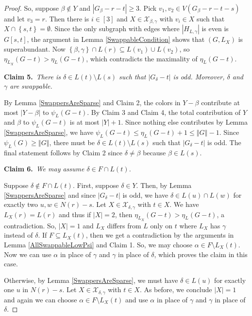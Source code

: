 \documentclass[12pt]{article}
\theoremstyle{plain}
\theoremstyle{definition}
\theoremstyle{remark}
\newcommand{\fancy}[1]{\mathcal{#1}}
\newcommand{\set}[1]{\left\{ #1 \right\}}
\newcommand{\card}[1]{\left|#1\right|}
\newcommand{\size}[1]{\left\Vert#1\right\Vert}
\newcommand{\irange}[1]{\left[#1\right]}
\def\X{\fancy{X}}
\newcommand{\claim}[2]{{\bf Claim #1.}~{\it #2}~~}
\begin{document}
\begin{proof}
		So, suppose $\beta \not \in Y$ and $\card{G_\beta - r - t} \ge 3$. Pick $v_1, v_2 \in V(G_\beta - r - t - s)$ and let $v_3 = r$.  Then there is $i \in \irange{3}$ and $X \in \X_{\beta,\gamma}$ with $v_i \in X$ such that $X \cap \set{s,t} = \emptyset$.  Since the only subgraph with edges where $\card{H_{L, \gamma}}$ is even is $G[s, t]$, the argument in Lemma \ref{SwappableCondition} shows that $(G,L_X)$ is superabundant.  Now $\set{\beta, \gamma} \cap L(r) \subseteq L(v_1) \cup L(v_2)$, so $\eta_{L_X}(G - t) > \eta_L(G - t)$, which contradicts the maximality of $\eta_L(G - t)$.
		
		\claim{5}{There is $\delta \in L(t) \setminus L(s)$ such that $\card{G_\delta - t}$ is odd.  Moreover, $\delta$ and $\gamma$ are swappable.}
		
			By Lemma \ref{SwappersAreSparse} and Claim 2, the colors in $Y - \beta$ contribute at most $|Y - \beta|$ to $\psi_L(G - t)$.  By Claim 3 and Claim 4, the total contribution of $Y$ and $\beta$ to $\psi_L(G - t)$ is at most $\card{Y} + 1$.  Since nothing else contributes by  Lemma \ref{SwappersAreSparse}, we have $\psi_L(G - t) \le \eta_L(G - t) + 1 \le \size{G} - 1$.  Since $\psi_L(G) \ge \size{G}$, there must be $\delta \in L(t) \setminus L(s)$ such that $\card{G_\delta - t}$ is odd.  The final statement follows by Claim 2 since $\delta \ne \beta$ because $\beta \in L(s)$.
			
		\claim{6}{We may assume $\delta \in F \cap L(t)$.}
		
			Suppose  $\delta \not \in F \cap L(t)$.  First, suppose $\delta \in Y$. Then, by Lemma \ref{SwappersAreSparse} and since $\card{G_\delta - t}$ is odd, we have $\delta \in L(u) \cap L(w)$ for exactly two $u,w \in N(r) - s$.   Let $X \in \X_{\delta,\gamma}$ with $t \in X$.  We have $L_X(r) = L(r)$ and thus if $|X| = 2$, then $\eta_{L_X}(G - t) > \eta_L(G - t)$, a contradiction.  So, $|X| = 1$ and $L_X$ differs from $L$ only on $t$ where $L_X$ has $\gamma$ instead of $\delta$. If $F \subseteq L_X(t)$, then we get a contradiction by the arguments in Lemma \ref{AllSwappableLowPsi} and Claim 1.  So, we may choose $\alpha \in F \setminus L_X(t)$. Now we can use $\alpha$ in place of $\gamma$ and $\gamma$ in place of $\delta$, which proves the claim in this case.
			
			Otherwise, by Lemma \ref{SwappersAreSparse}, we must have $\delta \in L(u)$ for exactly one $u$ in $N(r) - s$.  Let $X \in \X_{\delta,\gamma}$ with $t \in X$. As before, we conclude $|X| = 1$ and again we can choose $\alpha \in F \setminus L_X(t)$ and use $\alpha$ in place of $\gamma$ and $\gamma$ in place of $\delta$.
			

\end{proof}
\end{document}
